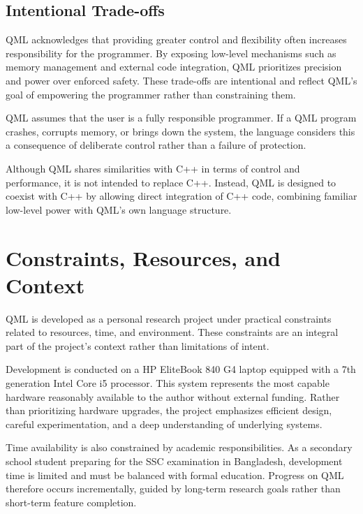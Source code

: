 \documentclass[12pt]{report}
\begin{document}
	\subsection{Intentional Trade-offs}
	
	QML acknowledges that providing greater control and flexibility often increases responsibility for the programmer. By exposing low-level mechanisms such as memory management and external code integration, QML prioritizes precision and power over enforced safety. These trade-offs are intentional and reflect QML’s goal of empowering the programmer rather than constraining them.
	
	\vspace{1.5em}
	
	\begin{funfactbox}{ }
		QML assumes that the user is a fully responsible programmer. If a QML program crashes, corrupts memory, or brings down the system, the language considers this a consequence of deliberate control rather than a failure of protection.
	\end{funfactbox}
	
	
	\begin{notebox}
		Although QML shares similarities with C++ in terms of control and performance, it is not intended to replace C++. Instead, QML is designed to coexist with C++ by allowing direct integration of C++ code, combining familiar low-level power with QML’s own language structure.
	\end{notebox}
	
	\section{Constraints, Resources, and Context}
	
	QML is developed as a personal research project under practical constraints related to resources, time, and environment. These constraints are an integral part of the project’s context rather than limitations of intent.
	
	Development is conducted on a HP EliteBook 840 G4 laptop equipped with a 7th generation Intel Core i5 processor. This system represents the most capable hardware reasonably available to the author without external funding. Rather than prioritizing hardware upgrades, the project emphasizes efficient design, careful experimentation, and a deep understanding of underlying systems.
	
	Time availability is also constrained by academic responsibilities. As a secondary school student preparing for the SSC examination in Bangladesh, development time is limited and must be balanced with formal education. Progress on QML therefore occurs incrementally, guided by long-term research goals rather than short-term feature completion.
	
\end{document}
